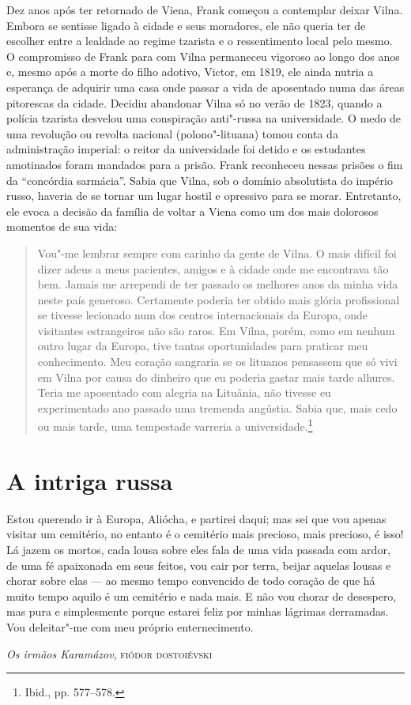Dez anos após ter retornado de Viena, Frank começou a contemplar deixar
Vilna. Embora se sentisse ligado à cidade e seus moradores, ele não
queria ter de escolher entre a lealdade ao regime tzarista e o
ressentimento local pelo mesmo. O compromisso de Frank para com Vilna
permaneceu vigoroso ao longo dos anos e, mesmo após a morte do filho
adotivo, Victor, em 1819, ele ainda nutria a esperança de adquirir uma
casa onde passar a vida de aposentado numa das áreas pitorescas da
cidade. Decidiu abandonar Vilna só no verão de 1823, quando a polícia
tzarista desvelou uma conspiração anti"-russa na universidade. O medo de
uma revolução ou revolta nacional (polono"-lituana) tomou conta da
administração imperial: o reitor da universidade foi detido e os
estudantes amotinados foram mandados para a prisão. Frank reconheceu
nessas prisões o fim da ``concórdia sarmácia''. Sabia que Vilna, sob o
domínio absolutista do império russo, haveria de se tornar um lugar
hostil e opressivo para se morar. Entretanto, ele evoca a decisão da
família de voltar a Viena como um dos mais dolorosos momentos de sua
vida:

\begin{quote}
Vou"-me lembrar sempre com carinho da gente de Vilna. O mais difícil foi
dizer adeus a meus pacientes, amigos e à cidade onde me encontrava tão
bem. Jamais me arrependi de ter passado os melhores anos da minha vida
neste país generoso. Certamente poderia ter obtido mais glória
profissional se tivesse lecionado num dos centros internacionais da
Europa, onde visitantes estrangeiros não são raros. Em Vilna, porém,
como em nenhum outro lugar da Europa, tive tantas oportunidades para
praticar meu conhecimento. Meu coração sangraria se os lituanos
pensassem que só vivi em Vilna por causa do dinheiro que eu poderia
gastar mais tarde alhures. Teria me aposentado com alegria na Lituânia, 
não tivesse eu experimentado ano passado uma tremenda angústia. Sabia
que, mais cedo ou mais tarde, uma tempestade varreria a
universidade.\footnote{Ibid., pp. 577--578.}
\end{quote}

%

\chapter{A intriga russa}

\epigraph{Estou querendo ir à Europa, Aliócha, e partirei daqui; mas sei que vou
apenas visitar um cemitério, no entanto é o cemitério mais precioso,
mais precioso, é isso! Lá jazem os mortos, cada lousa sobre eles fala de
uma vida passada com ardor, de uma fé apaixonada em seus feitos, vou
cair por terra, beijar aquelas lousas e chorar sobre elas --- ao mesmo
tempo convencido de todo coração de que há muito tempo aquilo é um
cemitério e nada mais. E não vou chorar de desespero, mas pura e
simplesmente porque estarei feliz por minhas lágrimas derramadas. Vou
deleitar"-me com meu próprio enternecimento.}{\textit{Os irmãos Karamázov}, \textsc{fiódor dostoiévski}\footnotemark}

